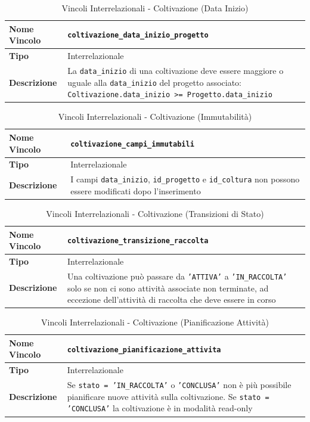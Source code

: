 \documentclass[12pt,a4paper]{article}
\begin{document}
\begin{table}[H]
\centering
\caption{Vincoli Interrelazionali - Coltivazione (Data Inizio)}
\begin{tabularx}{\textwidth}{|l|X|}
\hline
\textbf{Nome Vincolo} & \texttt{coltivazione\_data\_inizio\_progetto} \\
\hline
\textbf{Tipo} & Interrelazionale \\
\hline
\textbf{Descrizione} & La \texttt{data\_inizio} di una coltivazione deve essere maggiore o uguale alla \texttt{data\_inizio} del progetto associato: \texttt{Coltivazione.data\_inizio >= Progetto.data\_inizio} \\
\hline
\end{tabularx}
\end{table}

\begin{table}[H]
\centering
\caption{Vincoli Interrelazionali - Coltivazione (Immutabilità)}
\begin{tabularx}{\textwidth}{|l|X|}
\hline
\textbf{Nome Vincolo} & \texttt{coltivazione\_campi\_immutabili} \\
\hline
\textbf{Tipo} & Interrelazionale \\
\hline
\textbf{Descrizione} & I campi \texttt{data\_inizio}, \texttt{id\_progetto} e \texttt{id\_coltura} non possono essere modificati dopo l'inserimento \\
\hline
\end{tabularx}
\end{table}

\begin{table}[H]
\centering
\caption{Vincoli Interrelazionali - Coltivazione (Transizioni di Stato)}
\begin{tabularx}{\textwidth}{|l|X|}
\hline
\textbf{Nome Vincolo} & \texttt{coltivazione\_transizione\_raccolta} \\
\hline
\textbf{Tipo} & Interrelazionale \\
\hline
\textbf{Descrizione} & Una coltivazione può passare da \texttt{'ATTIVA'} a \texttt{'IN\_RACCOLTA'} solo se non ci sono attività associate non terminate, ad eccezione dell'attività di raccolta che deve essere in corso \\
\hline
\end{tabularx}
\end{table}

\begin{table}[H]
\centering
\caption{Vincoli Interrelazionali - Coltivazione (Pianificazione Attività)}
\begin{tabularx}{\textwidth}{|l|X|}
\hline
\textbf{Nome Vincolo} & \texttt{coltivazione\_pianificazione\_attivita} \\
\hline
\textbf{Tipo} & Interrelazionale \\
\hline
\textbf{Descrizione} & Se \texttt{stato = 'IN\_RACCOLTA'} o \texttt{'CONCLUSA'} non è più possibile pianificare nuove attività sulla coltivazione. Se \texttt{stato = 'CONCLUSA'} la coltivazione è in modalità read-only \\
\hline
\end{tabularx}
\end{table}
\end{document}
